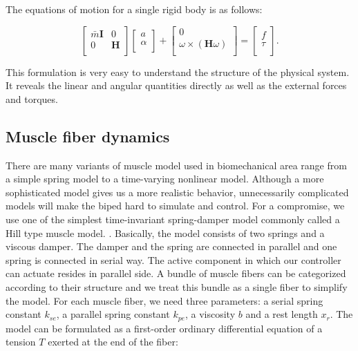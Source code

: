 \documentclass[a4paper,10pt]{article}
\begin{document}
The equations of motion for a single rigid body is as follows:

\begin{equation}
\left[ {\begin{array}{cc}
 \bar{m}\mathbf{I}  &  0 \\
 0            & \mathbf{H}  \\
 \end{array} } \right]
 \left[ {\begin{array}{c}
 a  \\
 \alpha              \\
 \end{array} } \right]
 +
 \left[ {\begin{array}{c}
 0  \\
 \omega\times(\mathbf{H}\omega)   \\
 \end{array} } \right]
 =
 \left[ {\begin{array}{c}
 f  \\
 \tau   \\
 \end{array} } \right].
\end{equation}

This formulation is very easy to understand the structure of
the physical system. It reveals the linear and angular quantities
directly as well as the external forces and torques.




\subsection{Muscle fiber dynamics}

There are many variants of muscle model used in biomechanical area range
from a simple spring model to a time-varying nonlinear model. \cite{25733}
Although a more sophisticated model gives us a more realistic behavior, unnecessarily
complicated models will make the biped hard to simulate and control. For a compromise,
we use one of the simplest time-invariant spring-damper model commonly called
a Hill type muscle model. \cite{hill}.
Basically, the model consists of two springs and a viscous damper.
The damper and the spring are connected in parallel and one spring is
connected in serial way. The active component in which our controller
can actuate resides in parallel side. A bundle of muscle fibers can be
categorized according to their structure and we treat this bundle as
a single fiber to simplify the model. For each muscle fiber, we need three
parameters: a serial spring constant $k_{se}$, a parallel spring constant $k_{pe}$,
a viscosity $b$ and a rest length $x_{r}$. The model can be formulated
as a first-order ordinary differential equation of a tension $T$ exerted
at the end of the fiber:
\end{document}
